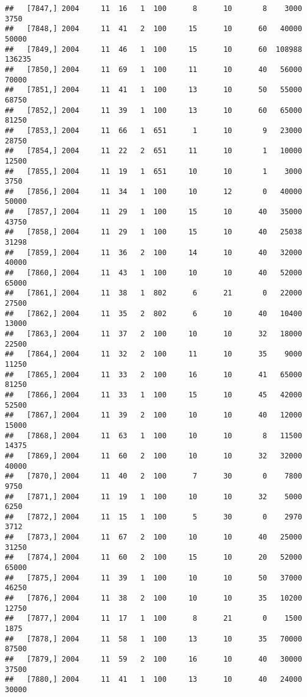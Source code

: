 \documentclass{article}\usepackage[]{graphicx}\usepackage[]{color}
\makeatletter
\newenvironment{kframe}{%
 \def\at@end@of@kframe{}%
 \ifinner\ifhmode%
  \def\at@end@of@kframe{\end{minipage}}%
  \begin{minipage}{\columnwidth}%
 \fi\fi%
 \def\FrameCommand##1{\hskip\@totalleftmargin \hskip-\fboxsep
 \colorbox{shadecolor}{##1}\hskip-\fboxsep
     \hskip-\linewidth \hskip-\@totalleftmargin \hskip\columnwidth}%
 \MakeFramed {\advance\hsize-\width
   \@totalleftmargin\z@ \linewidth\hsize
   \@setminipage}}%
 {\par\unskip\endMakeFramed%
 \at@end@of@kframe}
\newenvironment{knitrout}{}{} %
\makeatother
\begin{document}
\begin{knitrout}
\begin{kframe}
\begin{verbatim}
##   [7847,] 2004     11  16   1  100      8      10       8    3000    3750
##   [7848,] 2004     11  41   2  100     15      10      60   40000   50000
##   [7849,] 2004     11  46   1  100     15      10      60  108988  136235
##   [7850,] 2004     11  69   1  100     11      10      40   56000   70000
##   [7851,] 2004     11  41   1  100     13      10      50   55000   68750
##   [7852,] 2004     11  39   1  100     13      10      60   65000   81250
##   [7853,] 2004     11  66   1  651      1      10       9   23000   28750
##   [7854,] 2004     11  22   2  651     11      10       1   10000   12500
##   [7855,] 2004     11  19   1  651     10      10       1    3000    3750
##   [7856,] 2004     11  34   1  100     10      12       0   40000   50000
##   [7857,] 2004     11  29   1  100     15      10      40   35000   43750
##   [7858,] 2004     11  29   1  100     15      10      40   25038   31298
##   [7859,] 2004     11  36   2  100     14      10      40   32000   40000
##   [7860,] 2004     11  43   1  100     10      10      40   52000   65000
##   [7861,] 2004     11  38   1  802      6      21       0   22000   27500
##   [7862,] 2004     11  35   2  802      6      10      40   10400   13000
##   [7863,] 2004     11  37   2  100     10      10      32   18000   22500
##   [7864,] 2004     11  32   2  100     11      10      35    9000   11250
##   [7865,] 2004     11  33   2  100     16      10      41   65000   81250
##   [7866,] 2004     11  33   1  100     15      10      45   42000   52500
##   [7867,] 2004     11  39   2  100     10      10      40   12000   15000
##   [7868,] 2004     11  63   1  100     10      10       8   11500   14375
##   [7869,] 2004     11  60   2  100     10      10      32   32000   40000
##   [7870,] 2004     11  40   2  100      7      30       0    7800    9750
##   [7871,] 2004     11  19   1  100     10      10      32    5000    6250
##   [7872,] 2004     11  15   1  100      5      30       0    2970    3712
##   [7873,] 2004     11  67   2  100     10      10      40   25000   31250
##   [7874,] 2004     11  60   2  100     15      10      20   52000   65000
##   [7875,] 2004     11  39   1  100     10      10      50   37000   46250
##   [7876,] 2004     11  38   2  100     10      10      35   10200   12750
##   [7877,] 2004     11  17   1  100      8      21       0    1500    1875
##   [7878,] 2004     11  58   1  100     13      10      35   70000   87500
##   [7879,] 2004     11  59   2  100     16      10      40   30000   37500
##   [7880,] 2004     11  41   1  100     13      10      40   24000   30000

\end{verbatim}
\end{kframe}
\end{knitrout}
\end{document}
